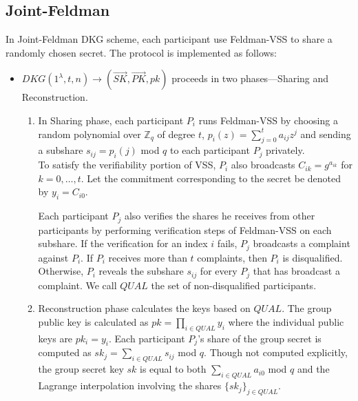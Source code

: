 \documentclass[letterpaper,twocolumn,10pt]{article}
\theoremstyle{definition}
\theoremstyle{remark}
\begin{document}
\subsection{Joint-Feldman}
\label{appendix:jointFeldman}
In Joint-Feldman DKG scheme, each participant use Feldman-VSS to share a randomly chosen secret. The protocol is implemented as follows:
\begin{itemize}
    \item $DKG(1^{\lambda}, t, n) \rightarrow (\vec{SK}, \vec{PK}, pk)$  proceeds in two phases---Sharing and Reconstruction.
    \begin{enumerate}
        \item In Sharing phase, each participant $P_i$ runs Feldman-VSS by choosing a random polynomial over $\mathbb{Z}_q$ of degree $t$, $p_i(z) = \sum_{j = 0}^{t} a_{ij} z^j$ and sending a subshare $s_{ij} = p_i(j)$ mod $q$ to each participant $P_j$ privately. \\
        To satisfy the verifiability portion of VSS, $P_i$ also broadcasts $C_{ik} = g^{a_{ik}}$ for $k = 0, \ldots, t$. Let the commitment corresponding to the secret be denoted by $y_i = C_{i0}$.
        
        Each participant $P_j$ also verifies the shares he receives from other participants by performing verification steps of Feldman-VSS on each subshare. If the verification for an index $i$ fails, $P_j$ broadcasts a complaint against $P_i$. If $P_i$ receives more than $t$ complaints, then $P_i$ is disqualified. Otherwise, $P_i$ reveals the subshare $s_{ij}$ for every $P_j$ that has broadcast a complaint. We call $QUAL$ the set of non-disqualified participants.
        
        \item Reconstruction phase calculates the keys based on $QUAL$.
        The group public key is calculated as $pk = \prod_{i \in QUAL} y_i$ where the individual public keys are $pk_i = y_i$. Each participant $P_j$'s share of the group secret is  computed as $sk_j = \sum_{i \in QUAL} s_{ij}$ mod $q$.  Though not computed explicitly, the group secret key $sk$ is equal to both $\sum_{i \in QUAL} a_{i0}$ mod $q$ and the Lagrange interpolation involving the shares $\{sk_j\}_{j \in QUAL}$.
    \end{enumerate}
\end{itemize}
\end{document}

